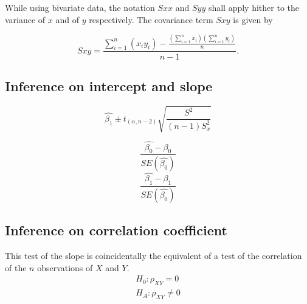 \documentclass[MAIN.tex]{subfiles}
\begin{document}
While using bivariate data, the notation $Sxx$ and $Syy$ shall apply hither to the variance of $x$ and of $y$ respectively. The covariance term $Sxy$ is given by

\begin{equation}
Sxy=\frac{\sum_{i=1}^{n}(x_{i}y_{i})-\frac{(\sum_{i=1}^{n}x_{i})(\sum_{i=1}^{n}y_{i})}{n}}{n-1}.
\end{equation}









\subsection{Inference on intercept and slope}
\begin{equation}
\hat{\beta_{1}} \pm t_{(\alpha, n-2) }
\sqrt{\frac{S^2}{(n-1)S^{2}_{x}}}
\end{equation}

\begin{equation}
\frac{\hat{\beta_{0}}-\beta_{0}}{SE(\hat{\beta_{0}})}
\end{equation}
\begin{equation}
\frac{\hat{\beta_{1}}-\beta_{1}}{SE(\hat{\beta_{0}})}
\end{equation}



\subsection{Inference on correlation coefficient} This test of
the slope is coincidentally the equivalent of a test of the
correlation of the $n$ observations of $X$ and $Y$.
\begin{eqnarray}
H_{0}: \rho_{XY} = 0 \nonumber \\
H_{A}: \rho_{XY} \ne 0 \nonumber \\
\end{eqnarray}







\end{document}

